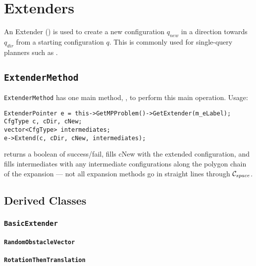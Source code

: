 \chapter{Extenders}

An Extender (\exte) is used to create a new configuration $q_{new}$ in a
direction towards $q_{dir}$ from a starting configuration $q$. This is commonly
used for single-query planners such as \rrt.

\section{\texttt{ExtenderMethod}}

\texttt{ExtenderMethod} has one main method, , to perform this main
operation. Usage:
\begin{lstlisting}
ExtenderPointer e = this->GetMPProblem()->GetExtender(m_eLabel);
CfgType c, cDir, cNew;
vector<CfgType> intermediates;
e->Extend(c, cDir, cNew, intermediates);
\end{lstlisting}
 returns a boolean of success/fail, fills cNew with the extended
configuration, and fills intermediates with any intermediate configurations
along the polygon chain of the expansion --- not all expansion methods go in
straight lines through $\mathcal{C}_{space}$.

\section{Derived Classes}

\subsection{\texttt{BasicExtender}}

\subsubsection{\texttt{RandomObstacleVector}}

\subsubsection{\texttt{RotationThenTranslation}}


